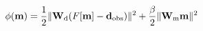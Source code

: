 \begin{equation}
\phi(\mathbf{m}) = \frac{1}{2}\|\mathbf{W}_{\rm d}(F[\mathbf{m}] - \mathbf{d}_{\rm obs})\|^2 + \frac{\beta}{2}\|\mathbf{W}_{\rm m}\mathbf{m}\|^2
\label{eq:objective_function}
\end{equation}
